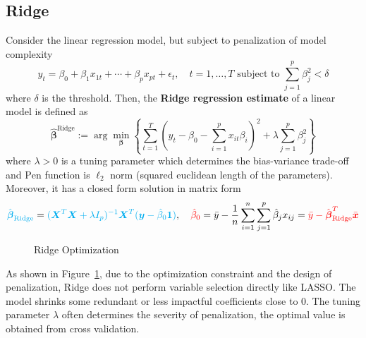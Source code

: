 \documentclass[oneside, 12pt]{article}
\newcommand*{\1}{\text{\scalebox{1.1}{\usefont{U}{bbold}{m}{n}1}}}
\begin{document}
\subsection{Ridge}
Consider the linear regression model, but subject to penalization of model complexity
$$
y_t = \beta_0 + \beta_1 x_{1t} + \cdots + \beta_p x_{pt} + \epsilon_t, \quad t = 1, \hdots, T \text{ subject to } \sum_{j = 1}^p \beta_j^2 < \delta
$$
where $\delta$ is the threshold. Then, the \textbf{Ridge regression estimate} of a linear model is defined as 
$$
\hat{\boldsymbol\beta}^{\text{Ridge}} := \arg\min_{\boldsymbol\beta} \left\{ \sum_{t=1}^T \left(y_t - \beta_0 - \sum_{i=1}^p x_{it}\beta_i\right)^2 + \lambda \sum_{j=1}^p \beta_j^2\right\}
$$
where $\lambda > 0$ is a tuning parameter which determines the bias-variance trade-off and $\mathrm{Pen}$ function is $\ell_2$ norm (squared euclidean length of the parameters). Moreover, it has a closed form solution in matrix form 
$$
\textcolor{cyan}{\hat{\boldsymbol\beta}_{\text{Ridge}}} = \textcolor{cyan}{(\boldsymbol X^T\boldsymbol X + \lambda I_p)^{-1} \boldsymbol X^T (\boldsymbol y - \hat{\beta}_0 \textbf{1})}, \quad \textcolor{red}{\hat{\beta}_0} = \bar{y} - \frac{1}{n}\sum_{i=1}^n\sum_{j=1}^p \hat{\beta}_j x_{ij} = \textcolor{red}{ \bar{y} - \hat{\boldsymbol\beta}^T_{\text{Ridge}} \bar{\boldsymbol x}}
$$

\begin{figure}[h]
\centering
{}
\caption{Ridge Optimization}
\label{fig:ridge_opt}
\end{figure}
As shown in Figure~\ref{fig:ridge_opt}, due to the optimization constraint and the design of penalization, Ridge does not perform variable selection directly like LASSO. The model shrinks some redundant or less impactful coefficients close to 0. The tuning parameter $\lambda$ often determines the severity of penalization, the optimal value is obtained from cross validation. 
\end{document}
